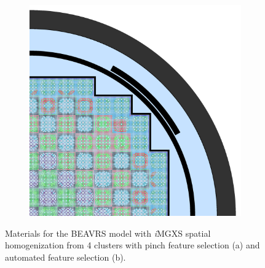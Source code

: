 \begin{figure}[h!]
\begin{subfigure}{0.68\textwidth}
  \includegraphics[width=\linewidth]{figures/unsupervised/geometries/with-features/4-clusters/combined/full-core}
  \caption{}
  \label{fig:chap10-full-core-combined-4}
\end{subfigure}
\caption[Materials for BEAVRS with clustering homogenization (4 clusters)]{Materials for the \ac{BEAVRS} model with \textit{i}\ac{MGXS} spatial homogenization from 4 clusters with pinch feature selection (a) and automated feature selection (b).}
\label{fig:chap10-full-core-geometries-4}
\end{figure}

\clearpage

